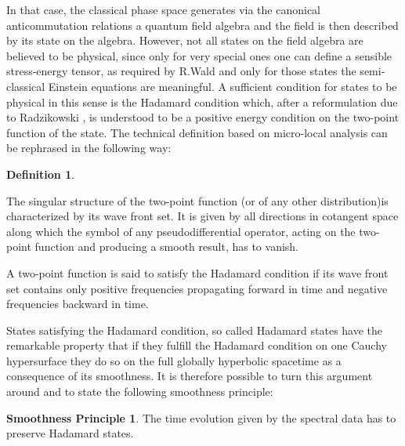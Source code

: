 \documentclass[a4paper,10pt,oneside]{amsart}
\theoremstyle{plain}
\theoremstyle{definition}
\newtheorem{definition}{Definition}
\newtheorem*{smoothness_principle}{Smoothness Principle}
\theoremstyle{remark}
\begin{document}
In that case, the classical phase space \coordHE{} generates
via the canonical anticommutation relations a quantum field
algebra and the field is then described by its state on the
algebra. However, not all states on the field algebra are believed
to be physical, since only for very special ones one can define a
sensible stress-energy tensor, as required by R.Wald \cite{Wald1977}
and only for
those states the semi-classical Einstein equations are meaningful.
A sufficient condition for states to be physical in this sense is
the Hadamard condition
\cite{Wald1978a,Wald1978b,Fulling-Sweeny-Wald,Fulling-Narcowich-Wald,
Kay-Wald,Verch1994,Radzikowski1996a,Radzikowski1996b,Junker,Wellmann,
Hollands1999a,Hollands1999b}
 which, after a
reformulation due to Radzikowski
\cite{Radzikowski1996a,Radzikowski1996b}, is understood to be a
positive energy condition on the two-point function of the state.
The technical definition based on micro-local analysis can be
rephrased in the following way:

\begin{definition}\label{hadamarddef}


  The singular structure of the two-point function
  (or of any other distribution)is characterized by its wave front set.
  It is given by all directions in cotangent space
  along which the symbol of any pseudodifferential operator, acting
  on the two-point
  function and producing a smooth result, has to vanish.

  A two-point function is said to satisfy
  the Hadamard condition if its wave
  front set contains only positive
  frequencies propagating forward in time
  and negative frequencies backward in time.
\end{definition}





 States satisfying the
Hadamard condition, so called Hadamard states have the remarkable property
that if they fulfill the Hadamard condition on one Cauchy
hypersurface they do so on the full globally hyperbolic spacetime
as a consequence of its smoothness. It is therefore possible to turn
this argument around and to state the following smoothness
principle:



\begin{smoothness_principle}\label{smoothnessprinciple}
The time evolution given by the spectral data \coordHE{} has to preserve
Hadamard states.
\end{smoothness_principle}
\end{document}
